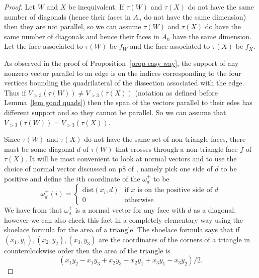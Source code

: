 \documentclass[11pt]{article}
\theoremstyle{remark}
\theoremstyle{definition}
\begin{document}
\begin{proof}
  Let $W$ and $X$ be inequivalent.  If $\tau(W)$ and $\tau(X)$ do not have the same number of diagonals (hence their faces in $A_n$ do not have the same dimension) then they are not parallel, so we can assume $\tau(W)$ and $\tau(X)$ do have the same number of diagonals and hence their faces in $A_n$ have the same dimension.  Let the face associated to $\tau(W)$ be $f_W$ and the face associated to $\tau(X)$ be $f_X$.

  As observed in the proof of Proposition~\ref{prop easy way}, the support of any nonzero vector parallel to an edge is on the indices corresponding to the four vertices bounding the quadrilateral of the dissection associated with the edge.  Thus if $V_{>3}(\tau(W)) \neq V_{>3}(\tau(X))$ (notation as defined before Lemma~\ref{lem good quads}) then the span of the vectors parallel to their edes has different support and so they cannot be parallel.  So we can assume that $V_{>3}(\tau(W)) = V_{>3}(\tau(X))$.

    Since $\tau(W)$ and $\tau(X)$ do not have the same set of non-triangle faces, there must be some diagonal $d$ of $\tau(W)$ that crosses through a non-triangle face $f$ of $\tau(X)$. 
    It will be most convenient to look at normal vectors and to use the choice of normal vector discussed on p8 of \cite{CSZinequivalent}, namely pick one side of $d$ to be positive and define the $i$th coordinate of the $\omega^+_d$ to be
    \[
    \omega^+_d(i) = \begin{cases} \text{dist}(x_i, d) & \text{if $x$ is on the positive side of $d$}\\ 0 & \text{otherwise} \end{cases}
    \]
    We have from \cite{CSZinequivalent} that $\omega^+_d$ is a normal vector for any face with $d$ as a diagonal, however we can also check this fact in a completely elementary way using the shoelace formula for the area of a triangle.  The shoelace formula says that if $(x_1, y_1), (x_2, y_2), (x_3, y_3)$ are the coordinates of the corners of a triangle in counterclockwise order then the area of the triangle is 
    \[(x_1y_2 - x_1y_3 + x_2y_3 - x_2y_1 + x_3y_1 - x_3y_2)/2.\]


\end{proof}
\end{document}
